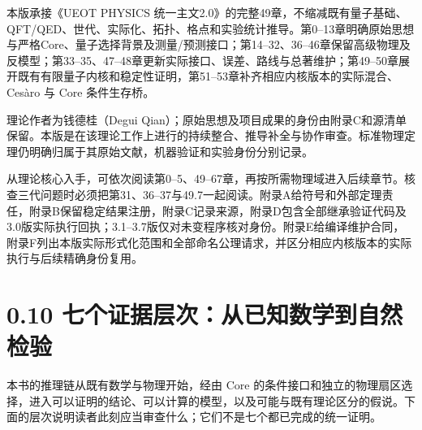 \documentclass[
  11pt,
  oneside]{book}
\begin{document}
本版承接《UEOT PHYSICS
统一主文2.0》的完整49章，不缩减既有量子基础、QFT/QED、世代、实际化、拓扑、格点和实验统计推导。第0--13章明确原始思想与严格Core、量子选择背景及测量/预测接口；第14--32、36--46章保留高级物理及反模型；第33--35、47--48章更新实际接口、误差、路线与总著维护；第49--50章展开既有有限量子内核和稳定性证明，第51--53章补齐相应内核版本的实际混合、Cesàro
与 Core 条件生存桥。

理论作者为钱德桂（Degui
Qian）；原始思想及项目成果的身份由附录C和源清单保留。本版是在该理论工作上进行的持续整合、推导补全与协作审查。标准物理定理仍明确归属于其原始文献，机器验证和实验身份分别记录。

从理论核心入手，可依次阅读第0--5、49--67章，再按所需物理域进入后续章节。核查三代问题时必须把第31、36--37与49.7一起阅读。附录A给符号和外部定理责任，附录B保留稳定结果注册，附录C记录来源，附录D包含全部继承验证代码及3.0版实际执行回执；3.1--3.7版仅对未变程序核对身份。附录E给编译维护合同，附录F列出本版实际形式化范围和全部命名公理请求，并区分相应内核版本的实际执行与后续精确身份复用。

\section{0.10 七个证据层次：从已知数学到自然检验}

本书的推理链从既有数学与物理开始，经由 Core
的条件接口和独立的物理扇区选择，进入可以证明的结论、可以计算的模型，以及可能与既有理论区分的假说。下面的层次说明读者此刻应当审查什么；它们不是七个都已完成的统一证明。
\end{document}
